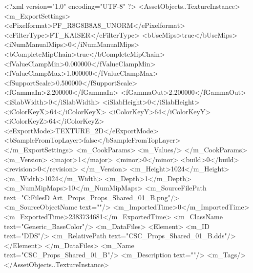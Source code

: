 <?xml version="1.0" encoding="UTF-8" ?>
<AssetObjects..TextureInstance>
	<m_ExportSettings>
		<ePixelformat>PF_R8G8B8A8_UNORM</ePixelformat>
		<eFilterType>FT_KAISER</eFilterType>
		<bUseMips>true</bUseMips>
		<iNumManualMips>0</iNumManualMips>
		<bCompleteMipChain>true</bCompleteMipChain>
		<fValueClampMin>0.000000</fValueClampMin>
		<fValueClampMax>1.000000</fValueClampMax>
		<fSupportScale>0.500000</fSupportScale>
		<fGammaIn>2.200000</fGammaIn>
		<fGammaOut>2.200000</fGammaOut>
		<iSlabWidth>0</iSlabWidth>
		<iSlabHeight>0</iSlabHeight>
		<iColorKeyX>64</iColorKeyX>
		<iColorKeyY>64</iColorKeyY>
		<iColorKeyZ>64</iColorKeyZ>
		<eExportMode>TEXTURE_2D</eExportMode>
		<bSampleFromTopLayer>false</bSampleFromTopLayer>
	</m_ExportSettings>
	<m_CookParams>
		<m_Values/>
	</m_CookParams>
	<m_Version>
		<major>1</major>
		<minor>0</minor>
		<build>0</build>
		<revision>0</revision>
	</m_Version>
	<m_Height>1024</m_Height>
	<m_Width>1024</m_Width>
	<m_Depth>1</m_Depth>
	<m_NumMipMaps>10</m_NumMipMaps>
	<m_SourceFilePath text="C:\Users\Shadow\Desktop\Working Files\3D Art\Textures\CSC_Props\Current\textures\CSC_Props_Shared_01_B.png"/>
	<m_SourceObjectName text=""/>
	<m_ImportedTime>0</m_ImportedTime>
	<m_ExportedTime>2383734681</m_ExportedTime>
	<m_ClassName text="Generic_BaseColor"/>
	<m_DataFiles>
		<Element>
			<m_ID text="DDS"/>
			<m_RelativePath text="CSC_Props_Shared_01_B.dds"/>
		</Element>
	</m_DataFiles>
	<m_Name text="CSC_Props_Shared_01_B"/>
	<m_Description text=""/>
	<m_Tags/>
</AssetObjects..TextureInstance>

